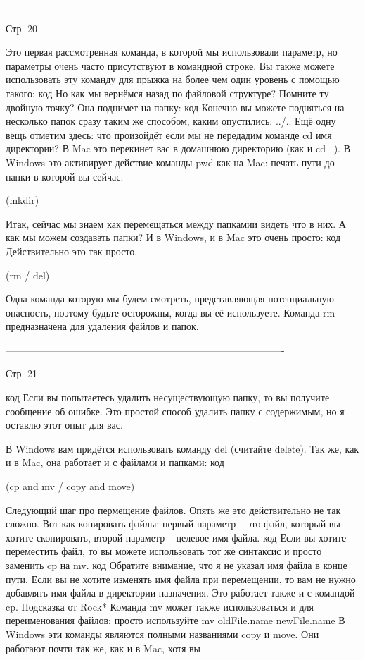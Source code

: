 -------------------------------------------------------------------------------------

Стр. 20

Это первая рассмотренная команда, в которой мы использовали параметр, но параметры 
очень часто присутствуют в командной строке. Вы также можете использовать эту команду
для прыжка на более чем один уровень с помощью такого:
{код}
Но как мы вернёмся назад по файловой структуре? Помните ту двойную точку? Она
поднимет на папку:
{код}
Конечно вы можете подняться на несколько папок сразу таким же способом, каким
опустились: ../..
Ещё одну вещь отметим здесь: что произойдёт если мы не передадим команде cd имя
директории? В Mac это перекинет вас в домашнюю директорию (как и cd ~). В Windows
это активирует действие команды pwd как на Mac: печать пути до папки в которой вы 
сейчас.

(mkdir)

Итак, сейчас мы знаем как перемещаться между папкамии видеть что в них. А как мы 
можем создавать папки? И в Windows, и в Mac это очень просто:
{код}
Действительно это так просто.

(rm / del)

Одна команда которую мы будем смотреть, представляющая потенциальную опасность,
поэтому будьте осторожны, когда вы её используете. Команда rm предназначена для
удаления файлов и папок.

-------------------------------------------------------------------------------------

Стр. 21

{код}
Если вы попытаетесь удалить несуществующую папку, то вы получите сообщение об ошибке.
Это простой способ удалить папку с содержимым, но я оставлю этот опыт для вас.

В Windows вам придётся использовать команду del (считайте delete). Так же, как и в 
Mac, она работает и с файлами и папками:
{код}

(cp and mv / copy and move)

Следующий шаг про пермещение файлов. Опять же это действительно не так сложно. Вот
как копировать файлы: первый параметр -- это файл, который вы хотите скопировать, 
второй параметр -- целевое имя файла.
{код}
Если вы хотите переместить файл, то вы можете использовать тот же синтаксис и просто
заменить cp на mv.
{код}
Обратите внимание, что я не указал имя файла в конце пути. Если вы не хотите изменять
имя файла при перемещении, то вам не нужно добавлять имя файла в директории 
назначения. Это работает также и с командой cp.
        Подсказка от Rock*
        Команда mv может также использоваться и для переименования файлов: просто
        используйте mv oldFile.name newFile.name
В Windows эти команды являются полными названиями copy и move. Они работают почти так
же, как и в Mac, хотя вы 

